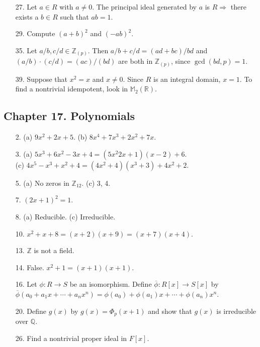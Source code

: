 {\begin{itemize}
\item[27.] 
Let $a \in R$ with $a \neq 0$. The principal ideal generated by $a$ is $R
\Rightarrow$ there exists a $b \in R$ such that $ab =1$.
 
 
\item[29.]
Compute $(a+b)^2$ and $(-ab)^2$.
 
 
\item[35.]
Let $a/b, c/d \in {\mathbb Z}_{(p)}$. Then \mbox{$a/b + c/d = (ad +
bc)/bd$} and $(a/b) \cdot (c/d) = (ac)/(bd)$ are both in ${\mathbb
Z}_{(p)}$, since $\gcd(bd,p)=1$.  

 
\item[39.]
Suppose that $x^2 = x$ and $x \neq 0$. Since $R$ is an integral
domain, $x = 1$. To find a nontrivial idempotent, look in ${\mathbb
M}_2({\mathbb R})$.
 
 
 
\end{itemize}
}
 
\subsection*{Chapter 17. Polynomials}
 
{\small
\begin{itemize}
 
\item[2.]
(a) $9 x^2 + 2 x + 5$.
(b) $8 x^4 + 7 x^3 + 2 x^2 + 7 x$.
 
\item[3.]
(a) $5 x^3 + 6 x^2 - 3 x + 4 = (5 x^2 2x + 1)(x -2) + 6$. \\
(c) $4x^5 - x^3 + x^2 + 4 = (4x^2 + 4)(x^3 + 3) + 4x^2 + 2$.
 
\item[5.]
(a) No zeros in ${\mathbb Z}_{12}$.
(c) 3, 4.
 
\item[7.]
$(2x+1)^2 = 1$.
 
 
\item[8.]
(a) Reducible.
(c) Irreducible.
 
 
\item[10.]
$x^2 + x + 8 = (x+2)(x+9) = (x+7)(x+4)$.
 
 
\item[13.]
${\mathbb Z}$ is not a field.
 
\item[14.]
False. $x^2 + 1 = (x+1)(x+1)$. 
 
\item[16.]
Let $\phi : R \rightarrow S$ be an isomorphism.  Define
$\overline{\phi} : R[x] \rightarrow S[x]$ by $\overline{\phi}(a_0 +
a_1 x + \cdots + a_n x^n) = \phi(a_0) + \phi(a_1) x + \cdots +
\phi(a_n) x^n$.
 

\item[20.]
Define $g(x)$ by  $g(x) = \Phi_p(x + 1)$ and show that $g(x)$ is
irreducible over ${\mathbb Q}$.


\item[26.]
Find a nontrivial proper ideal in $F[x]$.


\end{itemize}
}
 
